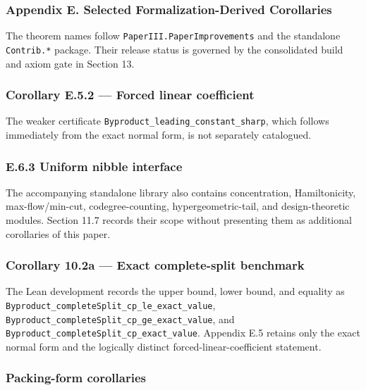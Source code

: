 \documentclass[english,11pt,a4paper]{article}
\begin{document}
\subsubsection{Appendix E. Selected Formalization-Derived
Corollaries}\label{appendix-e.-selected-formalization-derived-corollaries}

The theorem names follow \nolinkurl{PaperIII.PaperImprovements} and the
standalone \nolinkurl{Contrib.*} package. Their release status is governed
by the consolidated build and axiom gate in Section 13.

\subsubsection{Corollary E.5.2 --- Forced linear
coefficient}\label{corollary-e.5.2-forced-linear-coefficient-1}

The weaker certificate \nolinkurl{Byproduct_leading_constant_sharp},
which follows immediately from the exact normal form, is not separately
catalogued.

\subsubsection{E.6.3 Uniform nibble
interface}\label{e.6.3-uniform-nibble-interface-1}

The accompanying standalone library also contains concentration,
Hamiltonicity, max-flow/min-cut, codegree-counting, hypergeometric-tail,
and design-theoretic modules. Section 11.7 records their scope without
presenting them as additional corollaries of this paper.

\subsubsection{Corollary 10.2a --- Exact complete-split
benchmark}\label{corollary-10.2a-exact-complete-split-benchmark}

The Lean development records the upper bound, lower bound, and equality
as \nolinkurl{Byproduct_completeSplit_cp_le_exact_value},
\nolinkurl{Byproduct_completeSplit_cp_ge_exact_value}, and
\nolinkurl{Byproduct_completeSplit_cp_exact_value}. Appendix E.5
retains only the exact normal form and the logically distinct
forced-linear-coefficient statement.

\subsubsection{Packing-form corollaries}\label{packing-form-corollaries}
\end{document}
